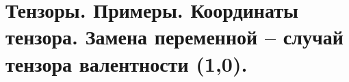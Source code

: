 \section{
 Тензоры. Примеры. Координаты тензора. Замена переменной – случай тензора валентности (1,0). %
}
